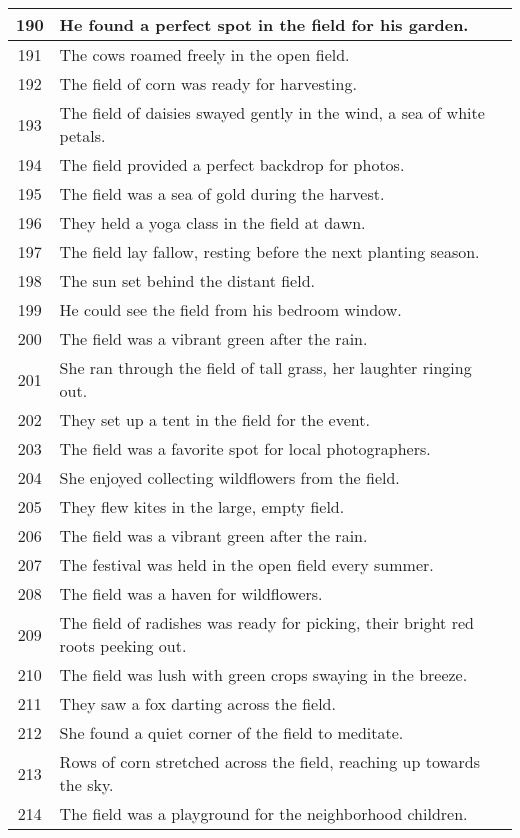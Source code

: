 \begin{longtable}{|c|p{12cm}|}
190 & He found a perfect spot in the field for his garden. \\ \hline
191 & The cows roamed freely in the open field. \\ \hline
192 & The field of corn was ready for harvesting. \\ \hline
193 & The field of daisies swayed gently in the wind, a sea of white petals. \\ \hline
194 & The field provided a perfect backdrop for photos. \\ \hline
195 & The field was a sea of gold during the harvest. \\ \hline
196 & They held a yoga class in the field at dawn. \\ \hline
197 & The field lay fallow, resting before the next planting season. \\ \hline
198 & The sun set behind the distant field. \\ \hline
199 & He could see the field from his bedroom window. \\ \hline
200 & The field was a vibrant green after the rain. \\ \hline
201 & She ran through the field of tall grass, her laughter ringing out. \\ \hline
202 & They set up a tent in the field for the event. \\ \hline
203 & The field was a favorite spot for local photographers. \\ \hline
204 & She enjoyed collecting wildflowers from the field. \\ \hline
205 & They flew kites in the large, empty field. \\ \hline
206 & The field was a vibrant green after the rain. \\ \hline
207 & The festival was held in the open field every summer. \\ \hline
208 & The field was a haven for wildflowers. \\ \hline
209 & The field of radishes was ready for picking, their bright red roots peeking out. \\ \hline
210 & The field was lush with green crops swaying in the breeze. \\ \hline
211 & They saw a fox darting across the field. \\ \hline
212 & She found a quiet corner of the field to meditate. \\ \hline
213 & Rows of corn stretched across the field, reaching up towards the sky. \\ \hline
214 & The field was a playground for the neighborhood children. \\ \hline

\end{longtable}
